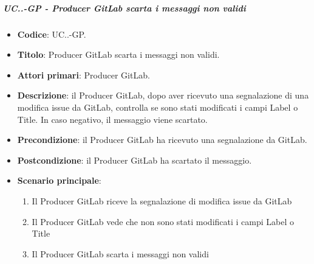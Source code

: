 		\subparagraph{UC\theuccount.\thesubuccount.\thesubsubuccount-GP - Producer GitLab scarta i messaggi non validi}
			
			\begin{itemize}
				\item \textbf{Codice}: UC\theuccount.\thesubuccount.\thesubsubuccount-GP.
				\item \textbf{Titolo}: Producer GitLab scarta i messaggi non validi.
				\item \textbf{Attori primari}: Producer GitLab.
				\item \textbf{Descrizione}: il Producer GitLab, dopo aver ricevuto una segnalazione di una modifica issue da GitLab, controlla
				se sono stati modificati i campi Label o Title. In caso negativo, il messaggio viene scartato.
				\item \textbf{Precondizione}: il Producer GitLab ha ricevuto una segnalazione da GitLab.
				\item \textbf{Postcondizione}: il Producer GitLab ha scartato il messaggio.
				\item \textbf{Scenario principale}: 
				\begin{enumerate}
					\item Il Producer GitLab riceve la segnalazione di modifica issue da GitLab
					\item Il Producer GitLab vede che non sono stati modificati i campi Label o Title
					\item Il Producer GitLab scarta i messaggi non validi
				\end{enumerate}
			\end{itemize}